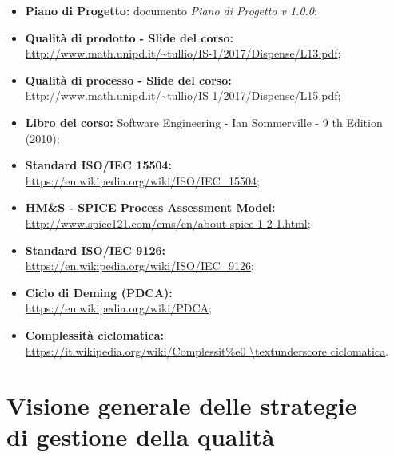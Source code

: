 \documentclass[openany,12pt,a4paper]{report}
\begin{document}
    \begin{itemize}
        \item \textbf{Piano di Progetto:} documento \textit{Piano di Progetto v 1.0.0};
        
        \item \textbf{Qualità di prodotto - Slide del corso:} 
        \\ \url{http://www.math.unipd.it/~tullio/IS-1/2017/Dispense/L13.pdf};
        
        \item \textbf{Qualità di processo - Slide del corso:} \\ \url{http://www.math.unipd.it/~tullio/IS-1/2017/Dispense/L15.pdf};
        
        \item \textbf{Libro del corso:} Software Engineering - Ian Sommerville - 9 th Edition (2010);
        
        \item \textbf{Standard ISO/IEC 15504:} 
        \\ \url{https://en.wikipedia.org/wiki/ISO/IEC_15504};
        
        \item \textbf{HM\&S - SPICE Process Assessment Model:} 
        \\ \url{http://www.spice121.com/cms/en/about-spice-1-2-1.html};
        
        \item \textbf{Standard ISO/IEC 9126:}
        \\ \url{https://en.wikipedia.org/wiki/ISO/IEC_9126};
        
        \item \textbf{Ciclo di Deming (PDCA):} 
        \\ \url{https://en.wikipedia.org/wiki/PDCA};
        
        \item \textbf{Complessità ciclomatica:} 
        \\ \url{https://it.wikipedia.org/wiki/Complessit\%e0 \textunderscore ciclomatica}.
    \end{itemize}


\chapter{Visione generale delle strategie \\ di gestione della qualità}
    
\end{document}
